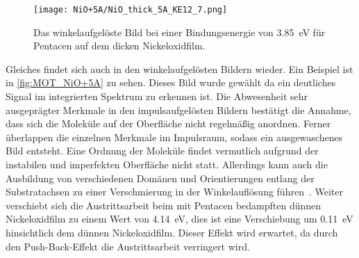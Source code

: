         \begin{figure}
            \centering
            \texttt{[image: NiO+5A/NiO\_thick\_5A\_KE12\_7.png]}
            \caption{Das winkelaufgelöste Bild bei einer Bindungsenergie von \SI{3.85}{\electronvolt} für Pentacen auf dem dicken Nickeloxidfilm.} %
            \label{fig:MOT_NiO+5A}
        \end{figure}
        Gleiches findet sich auch in den winkelaufgelösten Bildern wieder.
        Ein Beispiel ist in \autoref{fig:MOT_NiO+5A} zu sehen.
        Dieses Bild wurde gewählt da ein deutliches Signal im integrierten Spektrum zu erkennen ist.
        Die Abwesenheit sehr ausgeprägter Merkmale in den impulsaufgelösten Bildern bestätigt die Annahme, dass sich die Moleküle auf der Oberfläche nicht regelmäßig anordnen.
        Ferner überlappen die einzelnen Merkmale im Impulsraum, sodass ein ausgewaschenes Bild entsteht.
        Eine Ordnung der Moleküle findet vermutlich aufgrund der instabilen und imperfekten Oberfläche nicht statt.
        Allerdings kann auch die Ausbildung von verschiedenen Domänen und Orientierungen entlang der Substratachsen zu einer Verschmierung in der Winkelauflösung führen~\cite{scholl_chapter_2018}.
        Weiter verschiebt sich die Austrittsarbeit beim mit Pentacen bedampften dünnen Nickeloxidfilm zu einem Wert von \SI{4.14}{\electronvolt}, dies ist eine Verschiebung um \SI{0.11}{\electronvolt} hinsichtlich dem dünnen Nickeloxidfilm.
        Dieser Effekt wird erwartet, da durch den Push-Back-Effekt die Austrittsarbeit verringert wird.

